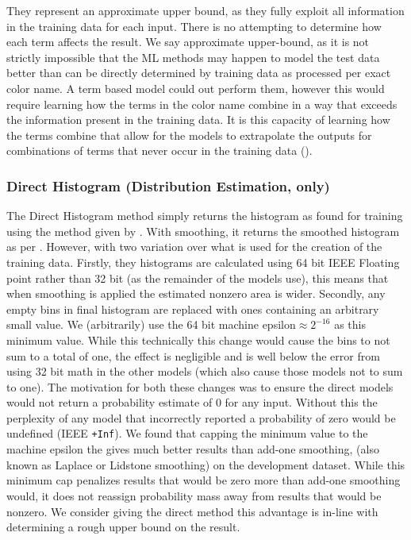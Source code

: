 \documentclass[11pt,a4paper]{article}
\begin{document}
They represent an approximate upper bound, as they fully exploit all information in the training data for each input.
There is no attempting to determine how each term affects the result.
We say approximate upper-bound, as it is not strictly impossible that the ML methods may happen to model the test data better than can be directly determined by training data as processed per exact color name.
A term based model could out perform them, however this would require learning how the terms in the color name combine in a way that exceeds the information present in the training data.
It is this capacity of learning how the terms combine that allow for the models to extrapolate the outputs for combinations of terms that never occur in the training data ().





\subsubsection{Direct Histogram (Distribution Estimation, only)}\label{sec:direct-histogram}
The Direct Histogram method simply returns the histogram as found for training using the method given by .
With smoothing, it returns the smoothed histogram as per .
However, with two variation over what is used for the creation of the training data.
Firstly, they histograms are calculated using 64 bit IEEE Floating point rather than 32 bit (as the remainder of the models use), this means that when smoothing is applied the estimated nonzero area is wider.
Secondly, any empty bins in final histogram are replaced with ones containing an arbitrary small value.
We (arbitrarily) use the 64 bit machine epsilon$\approx 2^{-16}$ as this minimum value.
While this technically this change would cause the bins to not sum to a total of one, the effect is negligible and is well below the error from using 32 bit math in the other models (which also cause those models not to sum to one).
The motivation for both these changes was to ensure the direct models would not return a probability estimate of 0 for any input.
Without this the perplexity of any model that incorrectly reported a probability of zero would be undefined (IEEE \texttt{+Inf}).
We found that capping the minimum value to the machine epsilon the gives much better results than add-one smoothing, (also known as  Laplace or Lidstone smoothing) on the development dataset.
While this minimum cap penalizes results that would be zero more than add-one smoothing would, it does not reassign probability mass away from results that would be nonzero.
We consider giving the direct method this advantage is in-line with determining a rough upper bound on the result.
\end{document}
